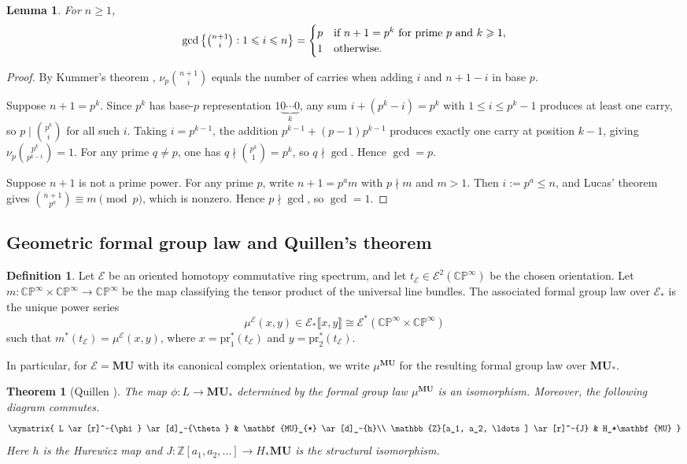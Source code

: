 \documentclass[a4paper]{amsart}
\theoremstyle{plain}
\newtheorem{theorem}[subsubsection]{Theorem}
\newtheorem{lemma}[subsubsection]{Lemma}
\theoremstyle{definition}
\newtheorem{definition}[subsubsection]{Definition}
\newcommand{\MU}{\mathbf{MU}}
\newcommand{\E}{\mathcal{E}}
\newcommand{\ZZ}{\mathbb{Z}}
\renewcommand{\le}{\leqslant}
\renewcommand{\ge}{\geqslant}
\begin{document}
\begin{lemma}\label{lem:binomial-gcd}
	For $n \ge 1$,
	\[
		\gcd\left\{\tbinom{n+1}{i} : 1 \le i \le n\right\}
		= \begin{cases}
			p & \text{if } n+1 = p^k \text{ for prime } p \text{ and } k \ge 1, \\
			1 & \text{otherwise.}
		\end{cases}
	\]
\end{lemma}
\begin{proof}
	By Kummer's theorem \cite{kummer1852uber}, $\nu_p\binom{n+1}{i}$ equals the number of carries when adding $i$ and $n+1-i$ in base $p$.

	Suppose $n+1 = p^k$.  Since $p^k$ has base-$p$ representation $1\underbrace{0\cdots 0}_{k}$, any sum $i + (p^k - i) = p^k$ with $1 \le i \le p^k - 1$ produces at least one carry, so $p \mid \binom{p^k}{i}$ for all such $i$.  Taking $i = p^{k-1}$, the addition $p^{k-1} + (p-1)p^{k-1}$ produces exactly one carry at position $k-1$, giving $\nu_p\binom{p^k}{p^{k-1}} = 1$.  For any prime $q \ne p$, one has $q \nmid \binom{p^k}{1} = p^k$, so $q \nmid \gcd$.  Hence $\gcd = p$.

	Suppose $n+1$ is not a prime power.  For any prime $p$, write $n+1 = p^a m$ with $p \nmid m$ and $m > 1$.  Then $i := p^a \le n$, and Lucas' theorem \cite{lucas1878the} gives $\binom{n+1}{p^a} \equiv m \pmod{p}$, which is nonzero.  Hence $p \nmid \gcd$, so $\gcd = 1$.
\end{proof}

\subsection{Geometric formal group law and Quillen's theorem}
\begin{definition}
	Let $\E$ be an oriented homotopy commutative ring spectrum, and let $t_{\E}\in \E^2(\mathbb{CP}^{\infty})$ be the chosen orientation. Let $m:\mathbb{CP}^{\infty}\times \mathbb{CP}^{\infty}\to \mathbb{CP}^{\infty}$ be the map classifying the tensor product of the universal line bundles. The associated formal group law over $\E_*$ is the unique power series
	\[
		\mu^{\E}(x,y)\in \E_*\llbracket x,y\rrbracket \cong \E^*(\mathbb{CP}^{\infty}\times \mathbb{CP}^{\infty})
	\]
	such that $m^*(t_{\E})=\mu^{\E}(x,y)$, where $x=\mathrm{pr}_1^*(t_{\E})$ and $y=\mathrm{pr}_2^*(t_{\E})$.

	In particular, for $\E=\MU$ with its canonical complex orientation, we write $\mu^{\MU}$ for the resulting formal group law over $\MU_*$.
\end{definition}
\begin{theorem}[Quillen \cite{quillen1969on}]
	The map $\phi:L \to \MU_{*}$ determined by the formal group law $\mu^{\MU}$ is an isomorphism. Moreover, the following diagram commutes.
	\[
		\xymatrix{
		L \ar[r]^-{\phi} \ar[d]_-{\theta} &  \MU_{*} \ar[d]_-{h}\\
		\ZZ[a_1, a_2, \ldots] \ar[r]^-{J} & H_*\MU
		}
	\]
	Here $h$ is the Hurewicz map and $J: \ZZ[a_1, a_2, \ldots] \to H_*\MU$ is the structural isomorphism.
\end{theorem}
\end{document}
